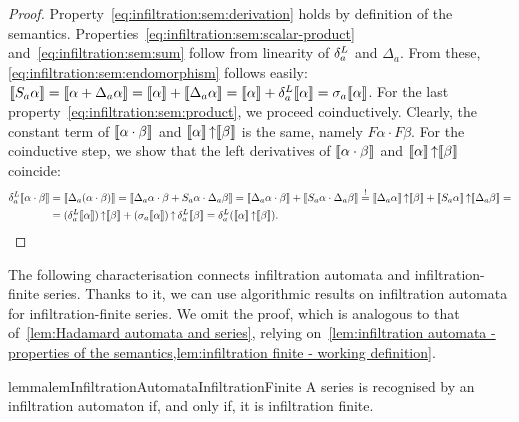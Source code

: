 \begin{proof}
    Property~\cref{eq:infiltration:sem:derivation}
    holds by definition of the semantics.
    Properties~\cref{eq:infiltration:sem:scalar-product} and~\cref{eq:infiltration:sem:sum}
    follow from linearity of $\delta^L_{a}$ and $\Delta_a$.
    From these, \cref{eq:infiltration:sem:endomorphism} follows easily:
    $
        \llbracket S_a \alpha\rrbracket
        = \llbracket\alpha + \Delta_a \alpha\rrbracket
        = \llbracket\alpha\rrbracket + \llbracket\Delta_a \alpha\rrbracket
        = \llbracket\alpha\rrbracket + \delta^L_{a} \llbracket\alpha\rrbracket
        = \sigma_a \llbracket\alpha\rrbracket$.
    For the last property~\cref{eq:infiltration:sem:product}, we proceed coinductively.
    Clearly, the constant term of $\llbracket\alpha \cdot \beta\rrbracket$ and $\llbracket\alpha\rrbracket \operatorname{\uparrow} \llbracket\beta\rrbracket$
    is the same, namely $F \alpha \cdot F \beta$.
    For the coinductive step, we show that the left derivatives
    of $\llbracket\alpha \cdot \beta\rrbracket$ and $\llbracket\alpha\rrbracket \operatorname{\uparrow} \llbracket\beta\rrbracket$ coincide:
    \begin{align*}
        \delta^L_{a} \llbracket\alpha \cdot \beta\rrbracket
            &= \llbracket\Delta_a (\alpha \cdot \beta)\rrbracket
            = \llbracket\Delta_a \alpha \cdot \beta + S_a \alpha \cdot \Delta_a \beta\rrbracket
            = \llbracket\Delta_a \alpha \cdot \beta\rrbracket + \llbracket S_a \alpha \cdot \Delta_a \beta\rrbracket
            \stackrel ! = \llbracket\Delta_a \alpha\rrbracket \operatorname{\uparrow} \llbracket\beta\rrbracket
                + \llbracket S_a \alpha\rrbracket \operatorname{\uparrow} \llbracket\Delta_a \beta\rrbracket = \\
            &= (\delta^L_{a} {\llbracket\alpha\rrbracket}) \operatorname{\uparrow} \llbracket\beta\rrbracket
                + (\sigma_a \llbracket\alpha\rrbracket )\operatorname{\uparrow} \delta^L_{a} \llbracket\beta\rrbracket
            = \delta^L_{a} (\llbracket\alpha\rrbracket \operatorname{\uparrow} \llbracket\beta\rrbracket). \qedhere
    \end{align*}
\end{proof}

The following characterisation connects infiltration automata and infiltration-finite series.
Thanks to it, we can use algorithmic results on infiltration automata for infiltration-finite series.
%
We omit the proof, which is analogous to that of~\cref{lem:Hadamard automata and series},
relying on~\cref{lem:infiltration automata - properties of the semantics,lem:infiltration finite - working definition}.
%
\begin{restatable}{lemma}{lemInfiltrationAutomataInfiltrationFinite}
    \label{lem:infiltration automata = infiltration finite}
    A series is recognised by an infiltration automaton
    if, and only if, it is infiltration finite.
\end{restatable}

